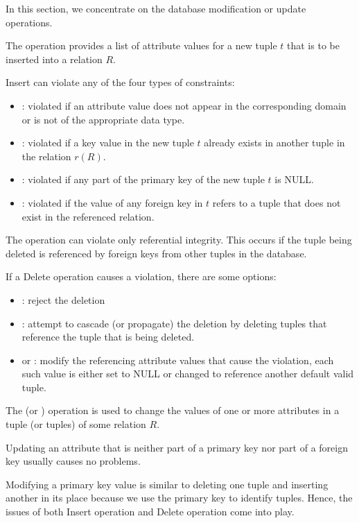   \par In this section, we concentrate on the database modification or update operations.

    \par The  operation provides a list of attribute values for a new tuple $t$ that is to be inserted into a relation $R$.

    \par Insert can violate any of the four types of constraints:

    \begin{itemize}
      \item {}: violated if an attribute value does not appear in the corresponding domain or is not of the appropriate data type.
      \item {}: violated if a key value in the new tuple $t$ already exists in another tuple in the relation $r(R)$.
      \item {}: violated if any part of the primary key of the new tuple $t$ is NULL.
      \item {}: violated if the value of any foreign key in $t$ refers to a tuple that does not exist in the referenced relation.
    \end{itemize}

    \par The  operation can violate only referential integrity. This occurs if the tuple being deleted is referenced by foreign keys from other tuples in the database.

    \par If a Delete operation causes a violation, there are some options:
    \begin{itemize}
      \item {}: reject the deletion
      \item {}: attempt to cascade (or propagate) the deletion by deleting tuples that reference the tuple that is being deleted.
      \item {} or : modify the referencing attribute values that cause the violation, each such value is either set to NULL or changed to reference another default valid tuple.
    \end{itemize}

    \par The  (or ) operation is used to change the values of one or more
attributes in a tuple (or tuples) of some relation $R$.
    \par Updating an attribute that is neither part of a primary key nor part of a foreign key usually causes no problems.
    \par Modifying a primary key value is similar to deleting one tuple and inserting another in its place because we use the primary key to identify tuples. Hence, the issues of both Insert operation and Delete operation come into play.

